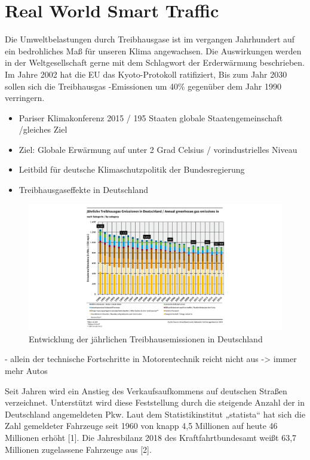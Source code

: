 \section{Real World Smart Traffic}

Die Umweltbelastungen durch Treibhausgase ist im vergangen Jahrhundert auf ein bedrohliches Maß für unseren Klima angewachsen. Die Auswirkungen werden in der Weltgesellschaft gerne mit dem Schlagwort der Erderwärmung beschrieben. Im Jahre 2002 hat die EU das Kyoto-Protokoll ratifiziert, Bis zum Jahr 2030 sollen sich die Treibhausgas -Emissionen um 40\% gegenüber dem Jahr 1990 verringern. 

\begin{itemize} 
\item Pariser Klimakonferenz 2015 / 195 Staaten globale Staatengemeinschaft  /gleiches Ziel
\item Ziel: Globale Erwärmung auf unter 2 Grad Celsius / vorindustrielles Niveau 
\item Leitbild für deutsche Klimaschutzpolitik der Bundesregierung
\item Treibhausgaseffekte in Deutschland
\end{itemize}

\begin{figure}[ht]
	\includegraphics[width=\textwidth]{images/jaehrlicheTreibhausEmissionen.png}
	\caption{Entwicklung der jährlichen Treibhausemissionen in Deutschland}
	\label{fig3}
\end{figure}

-	allein der technische Fortschritte in Motorentechnik reicht nicht aus -> immer mehr Autos

Seit Jahren wird ein Anstieg des Verkaufsaufkommens auf deutschen Straßen verzeichnet. Unterstützt wird diese Feststellung durch die steigende Anzahl der in Deutschland angemeldeten Pkw. Laut dem Statistikinstitut „statista“ hat sich die Zahl gemeldeter Fahrzeuge seit 1960 von knapp 4,5 Millionen auf heute 46 Millionen erhöht [1]. Die Jahresbilanz 2018 des Kraftfahrtbundesamt weißt 63,7 Millionen zugelassene Fahrzeuge aus [2].  

